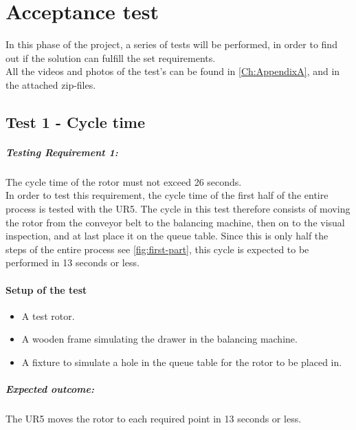 
\chapter{Acceptance test}\label{ch:Test}

In this phase of the project, a series of tests will be performed, in order to find out if the solution can fulfill the set requirements.\\ 
All the videos and photos of the test's can be found in \ref{Ch:AppendixA}, and in the attached zip-files.

\section{Test 1 - Cycle time}

\paragraph{Testing Requirement 1:} The cycle time of the rotor must not exceed 26 seconds.\\
In order to test this requirement, the cycle time of the first half of the entire process is tested with the UR5. The cycle in this test therefore consists of moving the rotor from the conveyor belt to the balancing machine, then on to the visual inspection, and at last place it on the queue table. Since this is only half the steps of the entire process see \ref{fig:first-part}, this cycle is expected to be performed in 13 seconds or less. 

\subsubsection{Setup of the test}

\begin{itemize}
   \item A test rotor.
   \item A wooden frame simulating the drawer in the balancing machine.
   \item A fixture to simulate a hole in the queue table for the rotor to be placed in.
   
\end{itemize}

\paragraph{Expected outcome:}
The UR5 moves the rotor to each required point in 13 seconds or less. 

